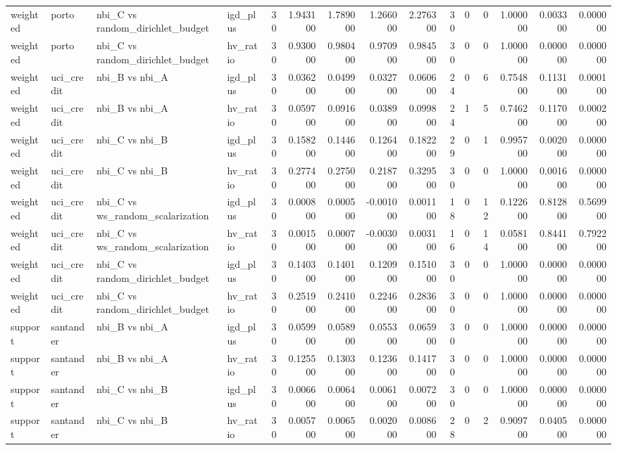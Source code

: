 \begin{landscape}
\begin{longtable}{llllrrrrrrrrrrr}
weighted & porto & nbi\_C vs random\_dirichlet\_budget & igd\_plus & 30 & 1.943100 & 1.789000 & 1.266000 & 2.276300 & 30 & 0 & 0 & 1.000000 & 0.003300 & 0.000000 \\
weighted & porto & nbi\_C vs random\_dirichlet\_budget & hv\_ratio & 30 & 0.930000 & 0.980400 & 0.970900 & 0.984500 & 30 & 0 & 0 & 1.000000 & 0.000000 & 0.000000 \\
weighted & uci\_credit & nbi\_B vs nbi\_A & igd\_plus & 30 & 0.036200 & 0.049900 & 0.032700 & 0.060600 & 24 & 0 & 6 & 0.754800 & 0.113100 & 0.000100 \\
weighted & uci\_credit & nbi\_B vs nbi\_A & hv\_ratio & 30 & 0.059700 & 0.091600 & 0.038900 & 0.099800 & 24 & 1 & 5 & 0.746200 & 0.117000 & 0.000200 \\
weighted & uci\_credit & nbi\_C vs nbi\_B & igd\_plus & 30 & 0.158200 & 0.144600 & 0.126400 & 0.182200 & 29 & 0 & 1 & 0.995700 & 0.002000 & 0.000000 \\
weighted & uci\_credit & nbi\_C vs nbi\_B & hv\_ratio & 30 & 0.277400 & 0.275000 & 0.218700 & 0.329500 & 30 & 0 & 0 & 1.000000 & 0.001600 & 0.000000 \\
weighted & uci\_credit & nbi\_C vs ws\_random\_scalarization & igd\_plus & 30 & 0.000800 & 0.000500 & -0.001000 & 0.001100 & 18 & 0 & 12 & 0.122600 & 0.812800 & 0.569900 \\
weighted & uci\_credit & nbi\_C vs ws\_random\_scalarization & hv\_ratio & 30 & 0.001500 & 0.000700 & -0.003000 & 0.003100 & 16 & 0 & 14 & 0.058100 & 0.844100 & 0.792200 \\
weighted & uci\_credit & nbi\_C vs random\_dirichlet\_budget & igd\_plus & 30 & 0.140300 & 0.140100 & 0.120900 & 0.151000 & 30 & 0 & 0 & 1.000000 & 0.000000 & 0.000000 \\
weighted & uci\_credit & nbi\_C vs random\_dirichlet\_budget & hv\_ratio & 30 & 0.251900 & 0.241000 & 0.224600 & 0.283600 & 30 & 0 & 0 & 1.000000 & 0.000000 & 0.000000 \\
support & santander & nbi\_B vs nbi\_A & igd\_plus & 30 & 0.059900 & 0.058900 & 0.055300 & 0.065900 & 30 & 0 & 0 & 1.000000 & 0.000000 & 0.000000 \\
support & santander & nbi\_B vs nbi\_A & hv\_ratio & 30 & 0.125500 & 0.130300 & 0.123600 & 0.141700 & 30 & 0 & 0 & 1.000000 & 0.000000 & 0.000000 \\
support & santander & nbi\_C vs nbi\_B & igd\_plus & 30 & 0.006600 & 0.006400 & 0.006100 & 0.007200 & 30 & 0 & 0 & 1.000000 & 0.000000 & 0.000000 \\
support & santander & nbi\_C vs nbi\_B & hv\_ratio & 30 & 0.005700 & 0.006500 & 0.002000 & 0.008600 & 28 & 0 & 2 & 0.909700 & 0.040500 & 0.000000 \\

\end{longtable}
\end{landscape}
